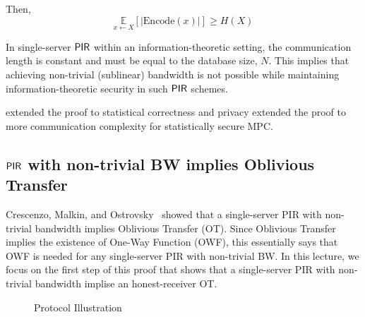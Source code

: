 {Then,
\begin{equation*}
\underset{x \leftarrow X}{\mathbb{E}}\left[ \lvert \text{Encode}(x) \rvert \right] \geq H(X)
\end{equation*}

In single-server ${\sf PIR}$ within an information-theoretic setting, the communication length is constant and must be equal to the database size, $N$. This implies that achieving non-trivial (sublinear) bandwidth is not possible while maintaining information-theoretic security in such ${\sf PIR}$ schemes.

\begin{remark}
\cite{DLN19} extended the proof to statistical correctness and privacy extended the proof to more communication complexity for statistically secure MPC. 
\end{remark}
}

\subsection{${\sf PIR}$ with non-trivial BW implies Oblivious Transfer}

Crescenzo, Malkin, and Ostrovsky~\cite{CMO00} showed that a single-server PIR with non-trivial bandwidth implies Oblivious Transfer (OT). Since Oblivious Transfer implies the existence of One-Way Function (OWF), this essentially says that OWF is needed for any single-server PIR with non-trivial BW.
In this lecture, we focus on the first step of this proof that shows that a single-server PIR with non-trivial bandwidth implise an honest-receiver OT.


\begin{figure}[ht]
    \centering
    \caption{Protocol Illustration}
    \label{fig:protocol2}
\end{figure}

